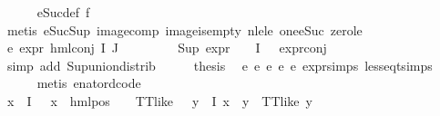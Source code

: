 \begin{isabellebody}
\ \ \ \ \isamarkupfalse%
\ eSuc{\isacharunderscore}{\kern0pt}def\ f{}{\isacharparenleft}{\kern0pt}{}{\isacharparenright}{\kern0pt}\isanewline
\ \ \ \ \isamarkupfalse%
\ {\isacharparenleft}{\kern0pt}metis\ eSuc{\isacharunderscore}{\kern0pt}Sup\ image{\isacharunderscore}{\kern0pt}comp\ image{\isacharunderscore}{\kern0pt}is{\isacharunderscore}{\kern0pt}empty\ nle{\isacharunderscore}{\kern0pt}le\ one{\isacharunderscore}{\kern0pt}eSuc\ zero{\isacharunderscore}{\kern0pt}le{\isacharparenright}{\kern0pt}\ \isanewline
\ \ \ \ \isamarkupfalse%
\ e{}{\isacharcolon}{\kern0pt}\ {\isachardoublequoteopen}expr{\isacharunderscore}{\kern0pt}{}\ {\isacharparenleft}{\kern0pt}hml{\isacharunderscore}{\kern0pt}conj\ I\ J\ {\isasymPhi}{\isacharparenright}{\kern0pt}\ {\isasymle}\ {}{\isachardoublequoteclose}\isanewline
\ \ \ \ \isamarkupfalse%
\ {\isacartoucheopen}Sup\ {\isacharparenleft}{\kern0pt}{\isacharparenleft}{\kern0pt}expr{\isacharunderscore}{\kern0pt}{}\ {\isasymcirc}\ {\isasymPhi}{\isacharparenright}{\kern0pt}\ {\isacharbackquote}{\kern0pt}\ I{\isacharparenright}{\kern0pt}\ {\isasymle}\ {}{\isacartoucheclose}\ expr{\isacharunderscore}{\kern0pt}{}{\isacharunderscore}{\kern0pt}conj\ \isanewline
\ \ \ \ \isamarkupfalse%
\ {\isacharparenleft}{\kern0pt}simp\ add{\isacharcolon}{\kern0pt}\ Sup{\isacharunderscore}{\kern0pt}union{\isacharunderscore}{\kern0pt}distrib{\isacharparenright}{\kern0pt}\isanewline
\ \ \isamarkupfalse%
\ \isamarkupfalse%
\ {\isacharquery}{\kern0pt}thesis\ \isamarkupfalse%
\ e{}\ e{}\ e{}\ e{}\ e{}\ expr{\isachardot}{\kern0pt}simps\ less{\isacharunderscore}{\kern0pt}eq{\isacharunderscore}{\kern0pt}t{\isachardot}{\kern0pt}simps\ \isanewline
\ \ \ \ \isamarkupfalse%
\ {\isacharparenleft}{\kern0pt}metis\ enat{\isacharunderscore}{\kern0pt}ord{\isacharunderscore}{\kern0pt}code{\isacharparenleft}{\kern0pt}{}{\isacharparenright}{\kern0pt}{\isacharparenright}{\kern0pt}\isanewline
{}\isamarkupfalse%
\isanewline
\ \ \isamarkupfalse%
\ {\isachardoublequoteopen}{\isasymexists}x{\isasymin}{\isasymPhi}\ {\isacharbackquote}{\kern0pt}\ I{\isachardot}{\kern0pt}\ {\isacharparenleft}{\kern0pt}{\isasymexists}{\isasymalpha}\ {\isasymchi}{\isachardot}{\kern0pt}\ x\ {\isacharequal}{\kern0pt}\ hml{\isacharunderscore}{\kern0pt}pos\ {\isasymalpha}\ {\isasymchi}\ {\isasymand}\ TT{\isacharunderscore}{\kern0pt}like\ {\isasymchi}{\isacharparenright}{\kern0pt}\ {\isasymand}\ {\isacharparenleft}{\kern0pt}{\isasymforall}y{\isasymin}{\isasymPhi}\ {\isacharbackquote}{\kern0pt}\ I{\isachardot}{\kern0pt}\ x\ {\isasymnoteq}\ y\ {\isasymlongrightarrow}\ TT{\isacharunderscore}{\kern0pt}like\ y{\isacharparenright}{\kern0pt}{\isachardoublequoteclose}\isanewline

\end{isabellebody}

